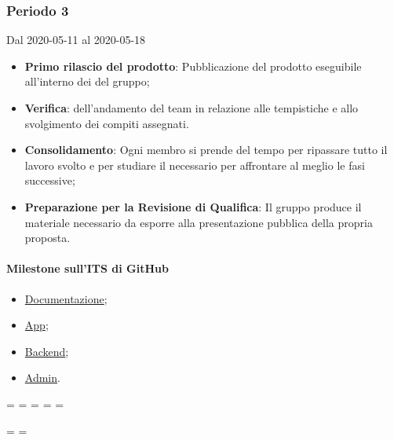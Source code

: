 \subsubsection{Periodo 3}
Dal 2020-05-11 al 2020-05-18
\begin{itemize}
	\item \textbf{Primo rilascio del prodotto}: Pubblicazione del prodotto eseguibile all'interno dei  del gruppo;
	\item \textbf{Verifica}:  dell'andamento del team in relazione alle tempistiche e allo svolgimento dei compiti assegnati.
	\item \textbf{Consolidamento}: Ogni membro si prende del tempo per ripassare tutto il lavoro svolto e per studiare il necessario per affrontare al meglio le fasi successive;
	\item \textbf{Preparazione per la Revisione di Qualifica}: Il gruppo produce il materiale necessario da esporre alla presentazione pubblica della propria proposta.
\end{itemize}
\paragraph{Milestone sull'ITS di GitHub}
\begin{itemize}
	\item \href{https://github.com/qb-team/Stalker-Documentazione/milestone/13}{Documentazione};
	\item \href{https://github.com/qb-team/Stalker-App/milestone/3}{App};
	\item \href{https://github.com/qb-team/Stalker-Backend/milestone/3}{Backend};
	\item \href{https://github.com/qb-team/Stalker-Admin/milestone/3}{Admin}.
\end{itemize}

\newpage
\paperwidth=\pdfpageheight
\paperheight=\pdfpagewidth
\pdfpageheight=\paperheight
\pdfpagewidth=\paperwidth
\headwidth=\textheight

\begingroup 
\vsize=\textwidth
\hsize=\textheight

